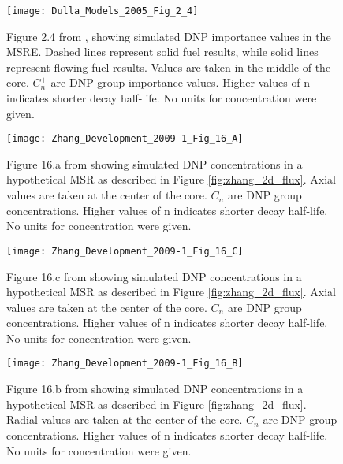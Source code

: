 \documentclass[review]{elsarticle}
\begin{document}
\begin{figure}[H]
   \centering
   \texttt{[image: Dulla\_Models\_2005\_Fig\_2\_4]}
   \caption{Figure 2.4 from \cite{dulla_models_2005}, showing simulated DNP
    importance values in the
    MSRE. Dashed lines represent
    solid fuel results, while solid lines represent flowing fuel results. Values
    are taken in the middle of the core. $C_{n}^{+}$ are DNP group importance values. 
    Higher values of n indicates shorter decay half-life. No units for concentration were given.}
   \label{fig:dulla_msre_dnp_importance}
\end{figure}

\begin{figure}[H]
   \centering
   \texttt{[image: Zhang\_Development\_2009-1\_Fig\_16\_A]}
   \caption{Figure 16.a from \cite{zhang_development_2009-1} showing simulated
                DNP concentrations
               in a hypothetical MSR as described in Figure \ref{fig:zhang_2d_flux}.
               Axial values are taken at the center of the core. $C_{n}$ are DNP
               group concentrations. Higher values of n indicates
               shorter decay half-life. No units for concentration were given.}
   \label{fig:zhang_axial_velocity_dnp_1}
\end{figure}

\begin{figure}[H]
   \centering
   \texttt{[image: Zhang\_Development\_2009-1\_Fig\_16\_C]}
   \caption{Figure 16.c from \cite{zhang_development_2009-1} showing simulated DNP concentrations
               in a hypothetical MSR as described in Figure \ref{fig:zhang_2d_flux}.
               Axial
               values are taken at the center of the core. $C_{n}$ are DNP
               group concentrations. Higher values of n indicates shorter decay half-life. No units for concentration were given.}
   \label{fig:zhang_axial_velocity_dnp_2}
\end{figure}

\begin{figure}[H]
   \centering
   \texttt{[image: Zhang\_Development\_2009-1\_Fig\_16\_B]}
   \caption{Figure 16.b from \cite{zhang_development_2009-1} showing simulated DNP concentrations
               in a hypothetical MSR as described in Figure \ref{fig:zhang_2d_flux}.
               Radial 
               values are taken at the center of the core. $C_{n}$ are DNP
               group concentrations. Higher values of n indicates shorter decay half-life. No units for concentration were given.}
   \label{fig:zhang_radial_velocity_dnp_1}
\end{figure}
\end{document}

